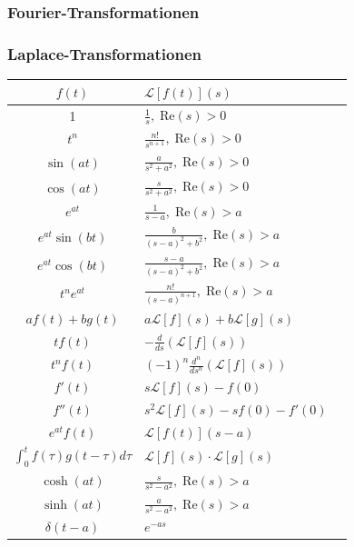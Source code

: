 \documentclass[a4paper,10pt]{article}
\def\Re{\text{Re}}
\begin{document}
\subsubsection{Fourier-Transformationen}

\subsubsection{Laplace-Transformationen}

\begin{center}
  \begin{tabularx}{\linewidth}{c>{\centering\arraybackslash}Xc}
  \toprule
  $f(t)$ & $\mathcal{L}[f(t)](s)$ \\
  \midrule
  1 & $\frac{1}{s}, \; \Re(s) >  0$ \\
  $t^n$ & $\frac{n!}{s^{n+1}}, \; \Re(s) >  0$ \\
  $\sin(at)$ & $\frac{a}{s^2 + a^2}, \; \Re(s) >  0$ \\
  $\cos(at)$ & $\frac{s}{s^2 + a^2}, \; \Re(s) >  0$ \\
  $e^{at}$ & $\frac{1}{s-a}, \; \Re(s) >  a$ \\
  $e^{at} \sin(bt)$ & $\frac{b}{(s-a)^2 + b^2}, \; \Re(s) >  a$ \\
  $e^{at} \cos(bt)$ & $\frac{s-a}{(s-a)^2 + b^2}, \; \Re(s) >  a$ \\
  $t^n e^{at}$ & $\frac{n!}{(s-a)^{n+1}}, \; \Re(s) >  a$ \\
  $a f(t) + b g(t)$ & $a \mathcal{L}[f](s) + b \mathcal{L}[g](s)$ \\
  $t f(t)$ & $-\frac{d}{ds} \left( \mathcal{L}[f](s) \right)$ \\
  $t^n f(t)$ & $(-1)^n \frac{d^n}{ds^n} \left( \mathcal{L}[f](s) \right)$ \\
  $f'(t)$ & $s \mathcal{L}[f](s) - f(0)$ \\
  $f''(t)$ & $s^2 \mathcal{L}[f](s) - s f(0) - f'(0)$ \\
  $e^{at} f(t)$ & $\mathcal{L}[f(t)](s - a)$ \\
  $\int_0^t f(\tau) g(t-\tau) d\tau$ & $\mathcal{L}[f](s) \cdot \mathcal{L}[g](s)$ \\
  $\cosh(at)$ & $\frac{s}{s^2 - a^2}, \; \Re(s) >  a$\\
  $\sinh(at)$ & $\frac{a}{s^2 - a^2}, \; \Re(s) >  a$\\
  $\delta(t - a)$ & $e^{-as}$\\
  \bottomrule
  \end{tabularx}
\end{center}
\end{document}
